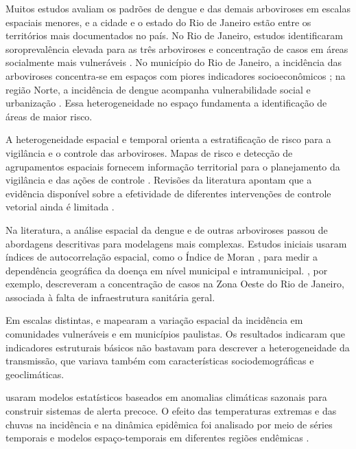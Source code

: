 Muitos estudos avaliam os padrões de dengue e das demais arboviroses em escalas espaciais menores, e a cidade e o estado do Rio de Janeiro estão entre os territórios mais documentados no país. No Rio de Janeiro, estudos identificaram soroprevalência elevada para as três arboviroses e concentração de casos em áreas socialmente mais vulneráveis \cite{2023-souza-santos-sobral-perisse}. No município do Rio de Janeiro, a incidência das arboviroses concentra-se em espaços com piores indicadores socioeconômicos \cite{2021-queiroz-medronho}; na região Norte, a incidência de dengue acompanha vulnerabilidade social e urbanização \cite{2023-gomes-jesus-quaresma}. Essa heterogeneidade no espaço fundamenta a identificação de áreas de maior risco.

A heterogeneidade espacial e temporal orienta a estratificação de risco para a vigilância e o controle das arboviroses. Mapas de risco e detecção de agrupamentos espaciais fornecem informação territorial para o planejamento da vigilância e das ações de controle \cite{parums2025,liu2025}. Revisões da literatura apontam que a evidência disponível sobre a efetividade de diferentes intervenções de controle vetorial ainda é limitada \cite{bowman2016}.

Na literatura, a análise espacial da dengue e de outras arboviroses passou de abordagens descritivas para modelagens mais complexas. Estudos iniciais usaram índices de autocorrelação espacial, como o Índice de Moran \cite{moran1950,anselin1995}, para medir a dependência geográfica da doença em nível municipal e intramunicipal. , por exemplo, descreveram a concentração de casos na Zona Oeste do Rio de Janeiro, associada à falta de infraestrutura sanitária geral.

Em escalas distintas,  e  mapearam a variação espacial da incidência em comunidades vulneráveis e em municípios paulistas. Os resultados indicaram que indicadores estruturais básicos não bastavam para descrever a heterogeneidade da transmissão, que variava também com características sociodemográficas e geoclimáticas.

 usaram modelos estatísticos baseados em anomalias climáticas sazonais para construir sistemas de alerta precoce. O efeito das temperaturas extremas e das chuvas na incidência e na dinâmica epidêmica foi analisado por meio de séries temporais e modelos espaço-temporais em diferentes regiões endêmicas \cite{xavier2021, ribeiro2025, alves2025}.

